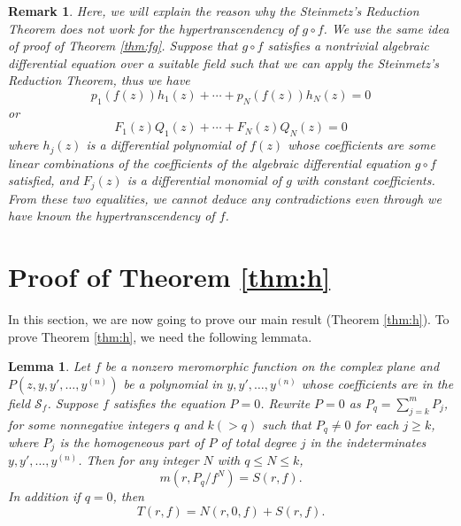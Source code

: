 \documentclass[reqno,12pt]{amsart}
\newtheorem{lem}{Lemma}
\newtheorem{rmk}{Remark}
\begin{document}
\begin{rmk}\label{rmk:fg}Here, we will explain the reason why the Steinmetz's Reduction Theorem does not work for the hypertranscendency of $g\circ f$.
We use the same idea of proof of Theorem \ref{thm:fg}. Suppose that $g\circ f$ satisfies a nontrivial algebraic differential equation over a suitable field such that we can apply the Steinmetz's Reduction Theorem, thus we have  
$$p_1(f(z))h_1(z)+\cdots+p_N(f(z))h_N(z)=0$$
or $$F_1(z)Q_1(z)+\cdots+F_N(z)Q_N(z)=0$$
where $h_j(z)$ is a differential polynomial of $f(z)$ whose coefficients are some linear combinations of the coefficients of the algebraic differential equation $g\circ f$ satisfied, and $F_j(z)$ is a differential monomial of $g$ with constant coefficients.
From these two equalities, we cannot deduce any contradictions even through we have known the hypertranscendency of $f$.
\end{rmk}


 \section{Proof of Theorem \ref{thm:h}}\label{sec:P}
 In this section, we are now going to prove our main result (Theorem \ref{thm:h}). To prove Theorem \ref{thm:h},  we need the following lemmata.
 




\begin{lem}\label{lem:sm}
Let $f$ be a nonzero meromorphic function on the complex plane and $P(z, y, y', \dots, y^{(n)})$ be a polynomial in $y, y', \dots, y^{(n)}$ whose coefficients are in the field $\mathcal{S}_f$. Suppose $f$ satisfies the equation $P=0$. Rewrite $P=0$ as $P_q=\sum_{j=k}^mP_j$, for some nonnegative integers $q$ and $k(>q)$ such that $P_q\neq 0$ for each $j\geq k$, where $P_j$ is the homogeneous part of $P$ of total degree $j$ in the indeterminates $y, y', \dots, y^{(n)}$. Then for any integer $N$ with $q\leq N\leq k$,  $$m(r, P_q/f^N)=S(r, f).$$ In addition if $q=0$, then $$T(r, f)=N(r, 0, f)+S(r, f).$$
\end{lem}
\end{document}
